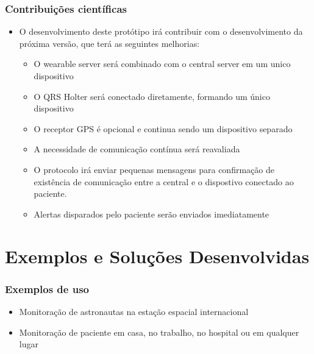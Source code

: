 \documentclass{beamer}
\begin{document}

\begin{frame}
\frametitle{Contribuições científicas}

	\begin{itemize}
		\item O desenvolvimento deste protótipo irá contribuir com o desenvolvimento da próxima versão, que terá as seguintes melhorias:
		\begin{itemize}
			\item O wearable server será combinado com o central server em um unico dispositivo
			\item O QRS Holter será conectado diretamente, formando um único dispositivo
			\item O receptor GPS é opcional e continua sendo um dispositivo separado
			\item A necessidade de comunicação contínua será reavaliada
			\item O protocolo irá enviar pequenas mensagens para confirmação de existência de comunicação entre a central e o dispostivo conectado ao paciente. 
			\item Alertas disparados pelo paciente serão enviados imediatamente
		\end{itemize}
	\end{itemize}
\end{frame}

\section{Exemplos e Soluções Desenvolvidas}

\begin{frame}
\frametitle{Exemplos de uso}

	\begin{itemize}
		\item Monitoração de astronautas na estação espacial internacional
		\item Monitoração de paciente em casa, no trabalho, no hospital ou em qualquer lugar
	\end{itemize}
\end{frame}
\end{document}
